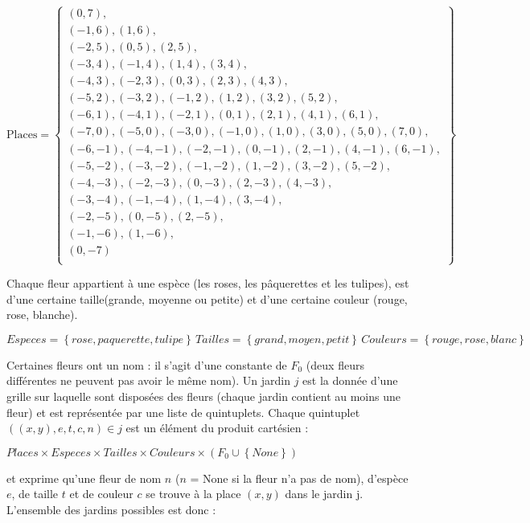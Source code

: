 \documentclass{article}
\theoremstyle{plain}
\theoremstyle{remark}
\begin{document}
\[
\mathrm{Places}  = \left \{
\begin{array}{c}
(0,7) ,
\\
(-1,6), (1,6) ,
\\
(-2,5) , (0,5) , (2,5),
\\
(-3,4) , (-1,4) , (1,4) , (3,4),
\\
(-4,3), (-2,3), (0,3) , (2,3), (4,3),
\\
(-5,2),(-3,2) , (-1,2) , (1,2) , (3,2), (5,2),
\\
(-6,1),(-4,1), (-2,1), (0,1) , (2,1) , (4,1),(6,1),
\\
(-7,0) , (-5,0) , (-3,0) , (-1,0) , (1,0) , (3,0) , (5,0) , (7,0) ,
\\
(-6,-1),(-4,-1), (-2,-1), (0,-1) , (2,-1), (4,-1),(6,-1),
\\
(-5,-2),(-3,-2), (-1,-2), (1,-2) , (3,-2),(5,-2),
\\
(-4,-3), (-2,-3) , (0,-3) , (2,-3), (4,-3),
\\
(-3,-4), (-1,-4), (1,-4) , (3,-4) ,
\\
(-2,-5) , (0,-5) , (2,-5),
\\
(-1,-6),  (1,-6),
\\
(0,-7)
\\
\end{array}
\right \}
\]

Chaque fleur appartient à une espèce (les roses, les pâquerettes et les tulipes), est d'une certaine taille(grande, moyenne ou petite) et d'une certaine couleur (rouge, rose, blanche).

 \begin{center}
 $Especes = \left \{rose, paquerette,tulipe\right \} \, Tailles = \left \{grand, moyen, petit\right \} \, Couleurs = \left \{rouge,rose, blanc\right \}$
 \end{center}

Certaines fleurs ont un nom : il s'agit d'une constante de $F_0$ (deux fleurs différentes ne peuvent pas avoir le même nom). Un jardin $j$ est la donnée d'une grille sur laquelle sont disposées des fleurs (chaque jardin contient
au moins une fleur) et est représentée par une liste de quintuplets. Chaque quintuplet $((x, y), e, t, c, n) \in j$ est un  élément du produit cartésien :

 \begin{center}
 $Places \times Especes \times Tailles \times Couleurs \times(F_0 \cup \left \{None\right \})$ 
 \end{center}
 
\noindent
et exprime qu'une fleur de nom $n$ ($n$ = None si la fleur n'a pas de nom), d'espèce $e$, de taille $t$ et de couleur $c$ se trouve à la place $(x, y)$ dans le jardin j. L'ensemble des jardins possibles est donc :
 
\end{document}
